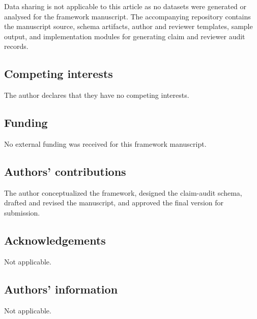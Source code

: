 \documentclass[12pt]{article}
\begin{document}
Data sharing is not applicable to this article as no datasets were generated or analysed for the framework manuscript. The accompanying repository contains the manuscript source, schema artifacts, author and reviewer templates, sample output, and implementation modules for generating claim and reviewer audit records.

\subsection*{Competing interests}

The author declares that they have no competing interests.

\subsection*{Funding}

No external funding was received for this framework manuscript.

\subsection*{Authors' contributions}

The author conceptualized the framework, designed the claim-audit schema, drafted and revised the manuscript, and approved the final version for submission.

\subsection*{Acknowledgements}

Not applicable.

\subsection*{Authors' information}

Not applicable.

\printbibliography
\end{document}
